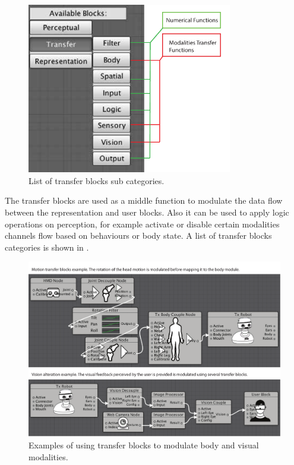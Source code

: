 \begin{figure}[htpb]
\centering
  \captionsetup{justification=centering}
\includegraphics[width=0.8\textwidth]{figures/system/Blocks/TransferBlocks.pdf}
\caption{List of transfer blocks sub categories.}
  \label{fig:system-transfer-blocks}
\end{figure}

The transfer blocks are used as a middle function to modulate the data flow between the representation and user blocks. Also it can be used to apply logic operations on perception, for example activate or disable certain modalities channels flow based on behaviours or body state. A list of transfer blocks categories is shown in .


\begin{figure}[t!]
\centering
  \captionsetup{justification=centering}
\includegraphics[width=1\textwidth]{figures/system/Blocks/TransferExample.pdf}
\caption{Examples of using transfer blocks to modulate body and visual modalities.}
  \label{fig:system-transfer-example}
\end{figure}

